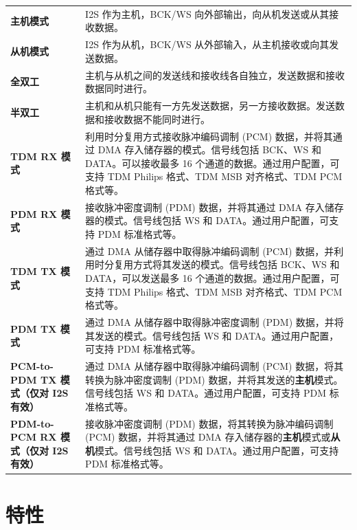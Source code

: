 \documentclass[main\_\_CN.tex]{subfiles}
\begin{document}
\begin{longtable}[c]{ R{4cm} p{10cm} }

\textbf{主机模式}     & I2S 作为主机，BCK/WS 向外部输出，向从机发送或从其接收数据。 \\
\textbf{从机模式}      & I2S 作为从机，BCK/WS 从外部输入，从主机接收或向其发送数据。 \\
\textbf{全双工} & 主机与从机之间的发送线和接收线各自独立，发送数据和接收数据同时进行。\\
\textbf{半双工} & 主机和从机只能有一方先发送数据，另一方接收数据。发送数据和接收数据不能同时进行。 \\
\textbf{TDM RX 模式} & 利用时分复用方式接收脉冲编码调制 (PCM) 数据，并将其通过 DMA 存入储存器的模式。信号线包括 BCK、WS 和 DATA。可以接收最多 16 个通道的数据。通过用户配置，可支持 TDM Philips 格式、TDM MSB 对齐格式、TDM PCM 格式等。\\
\textbf{PDM RX 模式} & 接收脉冲密度调制 (PDM) 数据，并将其通过 DMA 存入储存器的模式。信号线包括 WS 和 DATA。通过用户配置，可支持 PDM 标准格式等。\\
\textbf{TDM TX 模式} & 通过 DMA 从储存器中取得脉冲编码调制 (PCM) 数据，并利用时分复用方式将其发送的模式。信号线包括 BCK、WS 和 DATA，可以发送最多 16 个通道的数据。通过用户配置，可支持 TDM Philips 格式、TDM MSB 对齐格式、TDM PCM 格式等。\\
\textbf{PDM TX 模式} & 通过 DMA 从储存器中取得脉冲密度调制 (PDM) 数据，并将其发送的模式。信号线包括 WS 和 DATA。通过用户配置，可支持 PDM 标准格式等。\\
\textbf{PCM-to-PDM TX 模式（仅对 I2S 有效）} & 通过 DMA 从储存器中取得脉冲编码调制 (PCM) 数据，将其转换为脉冲密度调制 (PDM) 数据，并将其发送的\textbf{主机}模式。信号线包括 WS 和 DATA。通过用户配置，可支持 PDM 标准格式等。\\
\textbf{PDM-to-PCM RX 模式（仅对 I2S 有效）} & 接收脉冲密度调制 (PDM) 数据，将其转换为脉冲编码调制 (PCM) 数据，并将其通过 DMA 存入储存器的\textbf{主机}模式或\textbf{从机}模式。信号线包括 WS 和 DATA。通过用户配置，可支持 PDM 标准格式等。\\
\end{longtable}

\section{特性}
\end{document}
